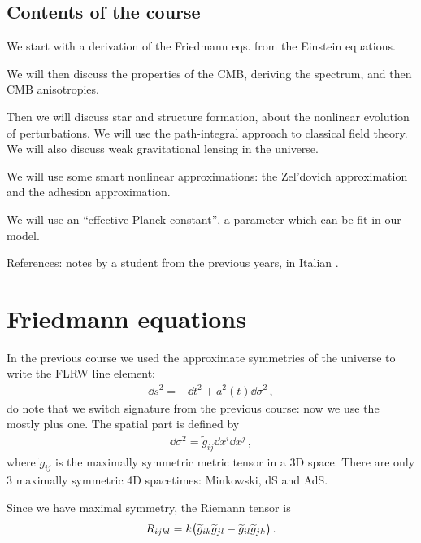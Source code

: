 \documentclass[main.tex]{subfiles}
\begin{document}

\section*{Contents of the course}

We start with a derivation of the Friedmann eqs. from the Einstein equations. 

We will then discuss the properties of the CMB, deriving the spectrum, and then CMB anisotropies. 

Then we will discuss star and structure formation, about the nonlinear evolution of perturbations. 
We will use the path-integral approach to classical field theory. 
We will also discuss weak gravitational lensing in the universe.

We will use some smart nonlinear approximations: the Zel'dovich approximation and the adhesion approximation.

We will use an ``effective Planck constant'', a parameter which can be fit in our model. 

References: notes by a student from the previous years, in Italian \cite{nataleNoteCorsoDi2017}. 

\chapter{Friedmann equations}

In the previous course we used the approximate symmetries of the universe to write the FLRW line element: 
%
\begin{align}
\dd{s^2} = -\dd{t^2} + a^2(t) \dd{\sigma^2}
\,,
\end{align}
%
do note that we switch signature from the previous course: now we use the mostly plus one.
The spatial part is defined by 
%
\begin{align}
\dd{\sigma^2} = \widetilde{g}_{ij} \dd{x^{i}} \dd{x^{j}}
\,,
\end{align}
%
where \(\widetilde{g}_{ij}\) is the maximally symmetric metric tensor in a 3D space. 
There are only 3 maximally symmetric 4D spacetimes: Minkowski, dS and AdS.

Since we have maximal symmetry, the Riemann tensor is 
%
\begin{align}
R_{ijkl} = k \qty(\widetilde{g}_{ik} \widetilde{g}_{jl} - \widetilde{g}_{il} \widetilde{g}_{jk})
\,.
\end{align}
\end{document}
